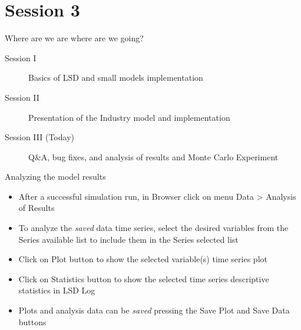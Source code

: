 \documentclass[bigger,aspectratio=169]{beamer}
\begin{document}
\section{Session 3}
\label{sec:org37d8a22}

\begin{frame}[label={sec:org7ea30f9}]{Where are we are where are we going?}
\begin{description}
\item[{Session I}] Basics of LSD and small models implementation
\item[{Session II}] Presentation of the Industry model and implementation
\item[{Session III (Today)}] Q\&A, bug fixes, and analysis of results and Monte Carlo Experiment
\end{description}
\end{frame}
\begin{frame}[label={sec:org580595d}]{Analyzing the model results}
\begin{itemize}
\item After a successful simulation run, in \alert{Browser} click on menu \alert{Data > Analysis of Results}
\item To analyze the \emph{saved} data time series, select the desired variables from the \alert{Series available} list to include them in the \alert{Series selected} list
\item Click on \alert{Plot} button to show the selected variable(s) time series plot
\item Click on \alert{Statistics} button to show the selected time series descriptive statistics in \alert{LSD Log}
\item Plots and analysis data can be \emph{saved} pressing the \alert{Save Plot} and \alert{Save Data} buttons
\end{itemize}
\end{frame}
\end{document}
